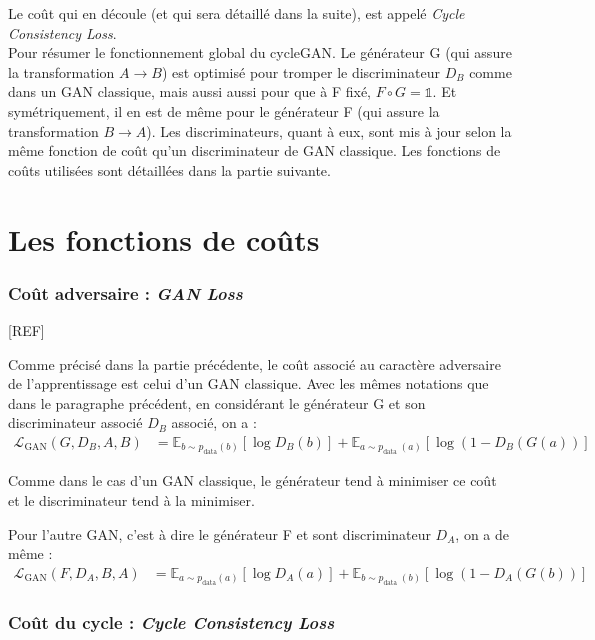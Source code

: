 Le coût qui en découle (et qui sera détaillé dans la suite), est appelé \textit{Cycle Consistency Loss}.\\

Pour résumer le fonctionnement global du cycleGAN. Le générateur G (qui assure la transformation $ A \rightarrow B $) est optimisé pour tromper le discriminateur $ D_B $ comme dans un GAN classique, mais aussi aussi pour que à F fixé, $ F \circ G = \mathbb{1} $. Et symétriquement, il en est de même pour le générateur F (qui assure la transformation $ B \rightarrow A $). Les discriminateurs, quant à eux, sont mis à jour selon la même fonction de coût qu'un discriminateur de GAN classique. Les fonctions de coûts utilisées sont détaillées dans la partie suivante.


\section{Les fonctions de coûts}

\subsubsection{Coût adversaire : \textit{GAN Loss}}

[REF]

Comme précisé dans la partie précédente, le coût associé au caractère adversaire de l'apprentissage est celui d'un GAN classique. Avec les mêmes notations que dans le paragraphe précédent, en considérant le générateur G et son discriminateur associé $D_B$ associé, on a :
$$\begin{aligned}
\mathcal{L}_{\mathrm{GAN}}\left(G, D_{B}, A, B\right) &=\mathbb{E}_{b \sim p_{\mathrm{data}}(b)}\left[\log D_{B}(b)\right] +\mathbb{E}_{a \sim p_{\text {data }}(a)}\left[\log \left(1-D_{B}(G(a))\right]\right.
\end{aligned}$$

Comme dans le cas d'un GAN classique, le générateur tend à minimiser ce coût et le discriminateur tend à la minimiser.

Pour l'autre GAN, c'est à dire le générateur F et sont discriminateur $D_A$, on a de même : $$\begin{aligned}
\mathcal{L}_{\mathrm{GAN}}\left(F, D_{A}, B, A\right) &=\mathbb{E}_{a \sim p_{\mathrm{data}}(a)}\left[\log D_{A}(a)\right] +\mathbb{E}_{b \sim p_{\text {data }}(b)}\left[\log \left(1-D_{A}(G(b))\right]\right.
\end{aligned}$$

\subsubsection{Coût du cycle : \textit{Cycle Consistency Loss}}

